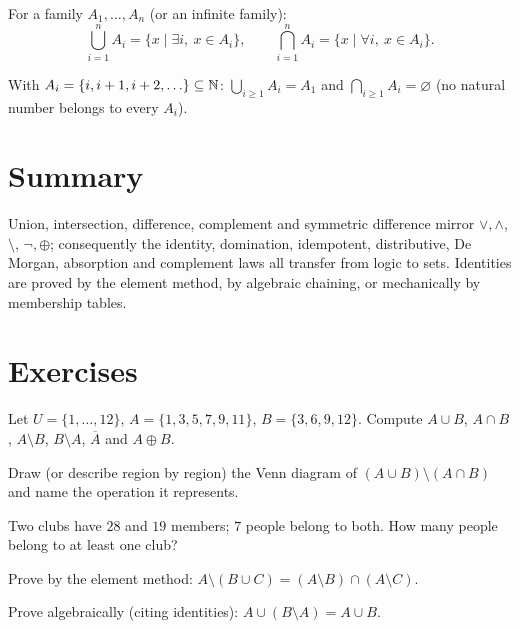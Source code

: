 For a family $A_1, \ldots, A_n$ (or an infinite family):
\[
\bigcup_{i=1}^{n} A_i = \{x \mid \exists i,\ x \in A_i\},
\qquad
\bigcap_{i=1}^{n} A_i = \{x \mid \forall i,\ x \in A_i\}.
\]

\begin{example}
With $A_i = \{i, i+1, i+2, \ldots\} \subseteq \mathbb{N}$:
$\bigcup_{i \geq 1} A_i = A_1$ and $\bigcap_{i \geq 1} A_i = \varnothing$
(no natural number belongs to every $A_i$).
\end{example}

\section{Summary}

Union, intersection, difference, complement and symmetric difference mirror
$\vee, \wedge$, $\setminus$, $\neg, \oplus$; consequently the identity,
domination, idempotent, distributive, De Morgan, absorption and complement
laws all transfer from logic to sets. Identities are proved by the element
method, by algebraic chaining, or mechanically by membership tables.

\section*{Exercises}

\begin{exercise}{\easy}
Let $U = \{1,\dots,12\}$, $A = \{1,3,5,7,9,11\}$, $B = \{3,6,9,12\}$.
Compute $A \cup B$, $A \cap B$, $A \setminus B$, $B \setminus A$,
$\overline{A}$ and $A \oplus B$.
\end{exercise}

\begin{exercise}{\easy}
Draw (or describe region by region) the Venn diagram of
$(A \cup B) \setminus (A \cap B)$ and name the operation it represents.
\end{exercise}

\begin{exercise}{\easy}
Two clubs have $28$ and $19$ members; $7$ people belong to both. How many
people belong to at least one club?
\end{exercise}

\begin{exercise}{\medium}
Prove by the element method: $A \setminus (B \cup C) =
(A \setminus B) \cap (A \setminus C)$.
\end{exercise}

\begin{exercise}{\medium}
Prove algebraically (citing identities): $A \cup (B \setminus A) = A \cup B$.
\end{exercise}

